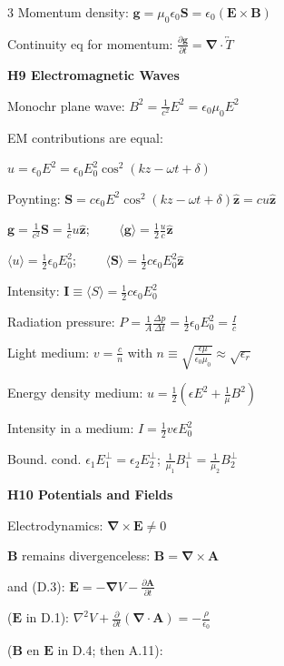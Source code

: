 \documentclass[a4paper,twoside]{article}
\newcommand{\secblock}[1]{%
\par\vspace{1.8pt}%
\noindent\colorbox{hdrcol}{\parbox[c][1.0em][c]{0.98\linewidth}{\color{white}\bfseries\small #1}}\par
\vspace{1pt}%
}
\begin{document}
\begin{multicols*}{3}
Momentum density: 
\(\bm g =  \mu_0 \epsilon_0 \bm S = \epsilon_0 (\bm E \times \bm B)\)


Continuity eq for momentum:
\(\frac{\partial \bm g}{\partial t} = \bm \nabla \cdot \overleftrightarrow{T} \)


\secblock{H9 Electromagnetic Waves}


Monochr plane wave:
\(B^2 = \frac{1}{c^2} E^2 = \epsilon_0 \mu_0 E^2\)

EM contributions are equal:

\(u = \epsilon_0 E^2 = \epsilon_0 E_0^2 \cos^2(k z - \omega t + \delta)\)

Poynting:
\(\bm S = c \epsilon_0 E^2 \cos^2(k z - \omega t + \delta) \hat{\bm z} = c u \hat{\bm z}\)

\(\bm g = \frac{1}{c^2} \bm S = \frac{1}{c} u \hat{\bm z}\);
\(\qquad \langle \bm g \rangle = \frac{1}{2} \frac{u}{c} \hat{\bm z}\)

\(\langle u \rangle = \frac{1}{2} \epsilon_0 E_0^2\);
\(\qquad \langle \bm S \rangle = \frac{1}{2} c \epsilon_0 E_0^2 \hat{\bm z}\)

Intensity: \(\bm I \equiv \langle  S \rangle = \frac{1}{2} c \epsilon_0 E_0^2 \)

Radiation pressure:
\(P = \frac{1}{A}\frac{\Delta p}{\Delta t} = \frac{1}{2}\epsilon_0 E_0^2 =\frac{I}{c}\)

Light medium:
\(v = \frac{c}{n}\)
with \(n \equiv \sqrt{\frac{\epsilon \mu}{\epsilon_0 \mu_0}} \approx \sqrt{\epsilon_r}\)

Energy density medium:
\(u = \frac{1}{2} (\epsilon E^2 + \frac{1}{\mu} B^2)\)

Intensity in a medium:
\(I = \frac{1}{2} v \epsilon E_0^2 \)

Bound. cond.
\(\epsilon_1 E_1^{\perp} = \epsilon_2 E_2^{\perp}\);
\(\frac{1}{\mu_1} B_1^{\perp} = \frac{1}{\mu_2} B_2^{\perp}\)

\secblock{H10 Potentials and Fields}

Electrodynamics: \(\bm \nabla \times \bm E \neq 0\)

\(\bm B\) remains divergenceless:
\(\bm B = \bm \nabla \times \bm A\)

and (D.3): \(\bm E = - \bm \nabla V - \frac{\partial \bm A}{\partial t}\) 

(\(\bm E\) in D.1):
\(\nabla^2 V + \frac{\partial }{\partial t}(\bm \nabla \cdot \bm A) = -\frac{\rho}{\epsilon_0}\)

(\(\bm B\) en \(\bm E\) in D.4; then A.11):


\end{multicols*}
\end{document}
